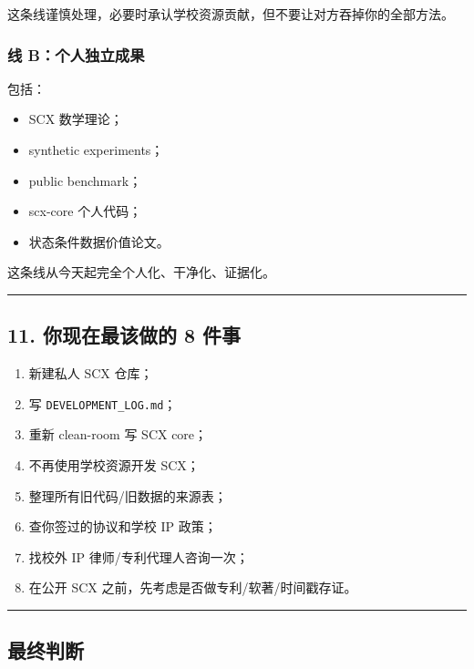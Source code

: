 \documentclass[
  12pt,
]{ctexart}
\providecommand{\tightlist}{%
  \setlength{\itemsep}{0pt}\setlength{\parskip}{0pt}}
\begin{document}
这条线谨慎处理，必要时承认学校资源贡献，但不要让对方吞掉你的全部方法。

\subsubsection{线
B：个人独立成果}\label{ux7ebf-bux4e2aux4ebaux72ecux7acbux6210ux679c}

包括：

\begin{itemize}
\tightlist
\item
  SCX 数学理论；
\item
  synthetic experiments；
\item
  public benchmark；
\item
  scx-core 个人代码；
\item
  状态条件数据价值论文。
\end{itemize}

这条线从今天起完全个人化、干净化、证据化。

\begin{center}\rule{0.5\linewidth}{0.5pt}\end{center}

\subsection{11. 你现在最该做的 8
件事}\label{ux4f60ux73b0ux5728ux6700ux8be5ux505aux7684-8-ux4ef6ux4e8b}

\begin{enumerate}
\def\labelenumi{\arabic{enumi}.}
\tightlist
\item
  新建私人 SCX 仓库；
\item
  写 \texttt{DEVELOPMENT\_LOG.md}；
\item
  重新 clean-room 写 SCX core；
\item
  不再使用学校资源开发 SCX；
\item
  整理所有旧代码/旧数据的来源表；
\item
  查你签过的协议和学校 IP 政策；
\item
  找校外 IP 律师/专利代理人咨询一次；
\item
  在公开 SCX 之前，先考虑是否做专利/软著/时间戳存证。
\end{enumerate}

\begin{center}\rule{0.5\linewidth}{0.5pt}\end{center}

\subsection{最终判断}\label{ux6700ux7ec8ux5224ux65ad-2}
\end{document}
